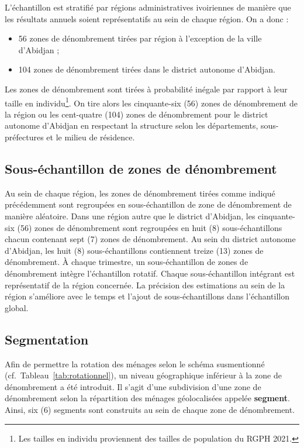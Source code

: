 \documentclass[12pt, a4paper]{article}
\begin{document}
L'échantillon est stratifié par régions administratives ivoiriennes de manière que les résultats annuels soient représentatifs au sein de chaque région. On a donc :
\begin{itemize}[noitemsep]
  \item 56 zones de dénombrement tirées par région à l'exception de la ville d'Abidjan ;
  \item 104 zones de dénombrement tirées dans le district autonome d'Abidjan.
\end{itemize}

Les zones de dénombrement sont tirées à probabilité inégale par rapport à leur taille en individu\footnote{Les tailles en individu proviennent des tailles de population du RGPH 2021.}. On tire alors les cinquante-six (56) zones de dénombrement de la région ou les cent-quatre (104) zones de dénombrement pour le district autonome d'Abidjan en respectant la structure selon les départements, sous-préfectures et le milieu de résidence.

\subsection{Sous-échantillon de zones de dénombrement}

Au sein de chaque région, les zones de dénombrement tirées comme indiqué précédemment sont regroupées en sous-échantillon de zone de dénombrement de manière aléatoire. Dans une région autre que le district d'Abidjan, les cinquante-six (56) zones de dénombrement sont regroupées en huit (8) sous-échantillons chacun contenant sept (7) zones de dénombrement. Au sein du district autonome d'Abidjan, les huit (8) sous-échantillons contiennent treize (13) zones de dénombrement. À chaque trimestre, un sous-échantillon de zones de dénombrement intègre l'échantillon rotatif. Chaque sous-échantillon intégrant est représentatif de la région concernée. La précision des estimations au sein de la région s'améliore avec le temps et l'ajout de sous-échantillons dans l'échantillon global.

\subsection{Segmentation}

Afin de permettre la rotation des ménages selon le schéma susmentionné (cf.\ Tableau~\ref{tab:rotationnel}), un niveau géographique inférieur à la zone de dénombrement a été introduit. Il s'agit d'une subdivision d'une zone de dénombrement selon la répartition des ménages géolocalisées appelée \textbf{segment}. Ainsi, six (6) segments sont construits au sein de chaque zone de dénombrement.
\end{document}
